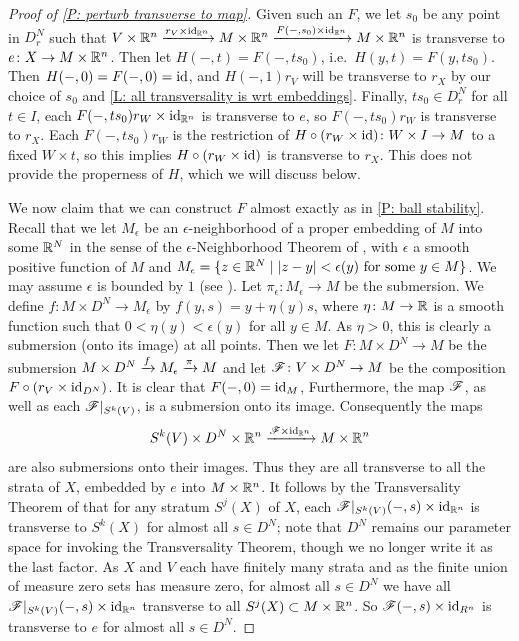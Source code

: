 \begin{proof}[Proof of \cref{P: perturb transverse to map}]
	Given such an $F$, we let $s_0$ be any point in $D_r^N$ such that $V \times \mathbb{R}^n \xrightarrow{r_V \times \mathrm{id}_{\mathbb{R}^n}} M \times \mathbb{R}^n \xrightarrow{F(-,s_0) \times \mathrm{id}_{\mathbb{R}^n}} M \times \mathbb{R}^n$ is transverse to $e \colon X \to M \times \mathbb{R}^n$.
	Then let $H(-,t) = F(-,ts_0)$, i.e.\ $H(y,t) = F(y,ts_0)$.
	Then $H(-,0) = F(-,0) = \mathrm{id}$, and $H(-,1)r_V$ will be transverse to $r_X$ by our choice of $s_0$ and \cref{L: all transversality is wrt embeddings}.
	Finally, $ts_0 \in D_r^N$ for all $t \in I$, each $F(-,ts_0)r_W \times \mathrm{id}_{\mathbb{R}^n}$ is transverse to $e$, so $F(-,ts_0)r_W$ is transverse to $r_X$.
	Each $F(-,ts_0)r_W$ is the restriction of $H \circ (r_W \times \mathrm{id}) \colon W \times I \to M$ to a fixed $W \times t$, so this implies $H \circ (r_W \times \mathrm{id})$ is transverse to $r_X$.
	This does not provide the properness of $H$, which we will discuss below.

	We now claim that we can construct $F$ almost exactly as in \cref{P: ball stability}.
	Recall that we let $M_\epsilon$ be an $\epsilon$-neighborhood of a proper embedding of $M$ into some $\mathbb{R}^N$ in the sense of the $\epsilon$-Neighborhood Theorem of \cite[Section 2.3]{GuPo74}, with $\epsilon$ a smooth positive function of $M$ and $M_\epsilon = \{z \in \mathbb{R}^N \mid |z-y|<\epsilon(y) \text{ for some }y \in M\}$.
	We may assume $\epsilon$ is bounded by $1$ (see \cite[Exercise 2.3.1]{GuPo74}).
	Let $\pi_\epsilon: M_\epsilon \to M$ be the submersion.
	We define $f: M \times D^N \to M_\epsilon$ by $f(y, s) = y + \eta(y) s$, where $\eta \colon M \to \mathbb{R}$ is a smooth function such that $0 < \eta(y) < \epsilon(y)$ for all $y \in M$.
	As $\eta > 0$, this is clearly a submersion (onto its image) at all points.
	Then we let $F \colon M \times D^N \to M$ be the submersion $M \times D^N \xrightarrow{f}M_\epsilon \xrightarrow{\pi} M$ and let $\mathscr{F} \colon V \times D^N \to M$ be the composition $F \circ (r_V \times \mathrm{id}_{D^N})$.
	It is clear that $F(-,0) = \mathrm{id}_M$,
	Furthermore, the map $\mathscr{F}$, as well as each $\mathscr{F}|_{S^k(V)}$, is a submersion onto its image.
	Consequently the maps
	$$S^k(V) \times D^N \times \mathbb{R}^n \xrightarrow{\mathscr{F} \times \mathrm{id}_{\mathbb{R}^n}} M \times \mathbb{R}^n$$
	are also submersions onto their images.
	Thus they are all transverse to all the strata of $X$, embedded by $e$ into $M \times \mathbb{R}^n$.
	It follows by the Transversality Theorem of \cite[Section 2.3]{GuPo74} that for any stratum $S^j(X)$ of $X$, each $\mathscr{F}|_{S^k(V)}(-,s) \times \mathrm{id}_{\mathbb{R}^n}$ is transverse to $S^k(X)$ for almost all $s \in D^N$; note that $D^N$ remains our parameter space for invoking the Transversality Theorem, though we no longer write it as the last factor.
	As $X$ and $V$ each have finitely many strata and as the finite union of measure zero sets has measure zero, for almost all $s \in D^N$ we have all $\mathscr{F}|_{S^k(V)}(-,s) \times \mathrm{id}_{\mathbb{R}^n}$ transverse to all $S^j(X) \subset M \times \mathbb{R}^n$.
	So $\mathscr{F}(-,s) \times \mathrm{id}_{R^n}$ is transverse to $e$ for almost all $s \in D^N$.


\end{proof}
